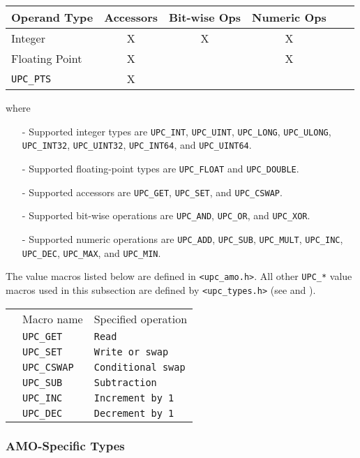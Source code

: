 \begin{center}
\begin{tabular}{l|ccccc}
Operand Type   & Accessors & Bit-wise Ops & Numeric Ops \\ \hline
Integer        &  X        &  X           &  X          \\
Floating Point &  X        &              &  X          \\
{\tt UPC\_PTS} &  X        &              &             \\
\end{tabular}
\end{center}

    where
\begin{itemize}
  \item[-] Supported integer types are {\tt UPC\_INT}, {\tt UPC\_UINT},
    {\tt UPC\_LONG}, {\tt UPC\_ULONG}, {\tt UPC\_INT32}, {\tt UPC\_UINT32},
    {\tt UPC\_INT64}, and {\tt UPC\_UINT64}.
  \item[-] Supported floating-point types are {\tt UPC\_FLOAT} and
    {\tt UPC\_DOUBLE}.
  \item[-] Supported accessors are {\tt UPC\_GET}, {\tt UPC\_SET}, and
    {\tt UPC\_CSWAP}.
  \item[-] Supported bit-wise operations are {\tt UPC\_AND}, {\tt UPC\_OR},
    and {\tt UPC\_XOR}.
  \item[-] Supported numeric operations are
    {\tt UPC\_ADD}, {\tt UPC\_SUB}, {\tt UPC\_MULT}, 
    {\tt UPC\_INC}, {\tt UPC\_DEC}, 
    {\tt UPC\_MAX}, and {\tt UPC\_MIN}.
\end{itemize}

\np The value macros listed below are defined in {\tt <upc\_amo.h>}.  
    All other {\tt UPC\_*} value macros used
    in this subsection are defined by {\tt <upc\_types.h>} (see
    \upcopsection{} and \upctypesection{}).

\newcommand\defmacrotab[2]{ & {\tt UPC\_#1}\index{UPC\_#1} & {\tt #2}\\}
\begin{tabular}{ p{30pt} l l }
& Macro name & Specified operation\\
\cline{2-3}
\defmacrotab{GET}       {Read}
\defmacrotab{SET}       {Write or swap}
\defmacrotab{CSWAP}     {Conditional swap}
\defmacrotab{SUB}       {Subtraction}
\defmacrotab{INC}       {Increment by 1}
\defmacrotab{DEC}       {Decrement by 1}
\end{tabular}

\subsubsection{AMO-Specific Types}
\label{upc-amo-types}

